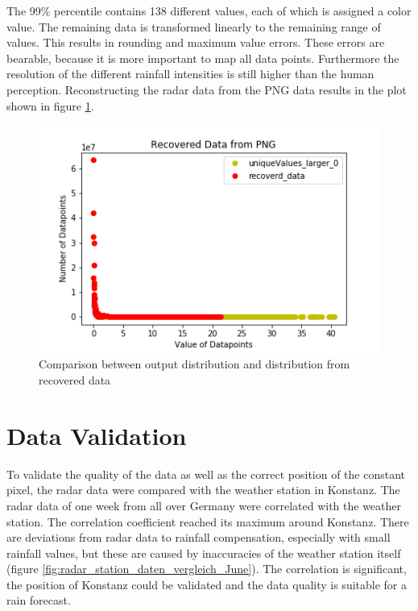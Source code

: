 \documentclass[oneside]{htwg-report}
\begin{document}
The 99\% percentile contains 138 different values, each of which is assigned a color value.
The remaining data is transformed linearly to the remaining range of values.
This results in rounding and maximum value errors. These errors are bearable, because it is more important to map all data points.
Furthermore the resolution of the different rainfall intensities is still higher than the human perception.
Reconstructing the radar data from the PNG data results in the plot shown in figure \ref{fig:Radardatapoints_of_June_2016_RecoveredData}.

\begin{figure}[ht]
    \centering
    \includegraphics[width=1\linewidth,angle=0]{../abb/Radardatapoints_of_June_2016_RecoveredData.png}
    \caption[Datenaufbereitung]{Comparison between output distribution and distribution from recovered data}
    \label{fig:Radardatapoints_of_June_2016_RecoveredData}
\end{figure}






\section*{Data Validation}\label{data validation}

To validate the quality of the data as well as the correct position of the constant pixel, the radar data were compared with the weather station in Konstanz.
The radar data of one week from all over Germany were correlated with the weather station.
The correlation coefficient reached its maximum around Konstanz.
There are deviations from radar data to rainfall compensation, especially with small rainfall values, but these are caused by inaccuracies of the weather station itself (figure \ref{fig:radar_station_daten_vergleich_June}).
The correlation is significant, the position of Konstanz could be validated and the data quality is suitable for a rain forecast.
\end{document}
